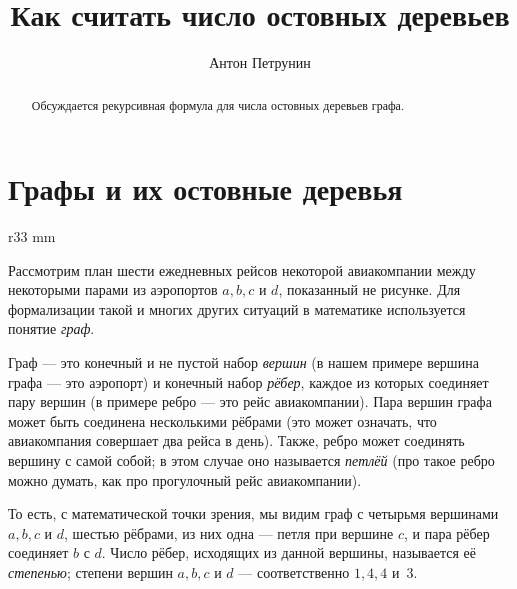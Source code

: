 \documentclass{article}
\begin{document}
\title{Как считать число остовных деревьев}
\author{Антон Петрунин}
\date{}
\maketitle

\begin{abstract}
Обсуждается рекурсивная формула для числа остовных деревьев графа.
\end{abstract}



\section{Графы и их остовные деревья}

\begin{wrapfigure}{r}{33 mm}
\end{wrapfigure}

Рассмотрим план шести ежедневных рейсов некоторой авиакомпании между некоторыми парами из аэропортов $a,b,c$ и $d$,
показанный не рисунке.
Для формализации такой и многих других ситуаций в математике используется понятие \emph{граф}.

Граф --- это конечный и не пустой набор \emph{вершин} (в нашем примере вершина графа --- это аэропорт) 
и конечный набор \emph{рёбер}, каждое из которых соединяет пару вершин (в примере ребро --- это рейс авиакомпании).
Пара вершин графа может быть соединена несколькими рёбрами (это может означать, что авиакомпания совершает два рейса в день). 
Также, ребро может соединять вершину с самой собой; в этом случае оно называется \emph{петлёй} (про такое ребро можно думать, как про прогулочный рейс авиакомпании).

То есть, с математической точки зрения, мы видим граф с четырьмя вершинами $a,b,c$ и $d$, 
шестью рёбрами, из них
одна --- петля при вершине $c$, и пара рёбер соединяет $b$ с $d$.
Число рёбер, исходящих из данной вершины, называется её \emph{степенью};
степени вершин $a,b,c$ и $d$ --- соответственно $1,4,4$ и~$3$.
\end{document}

